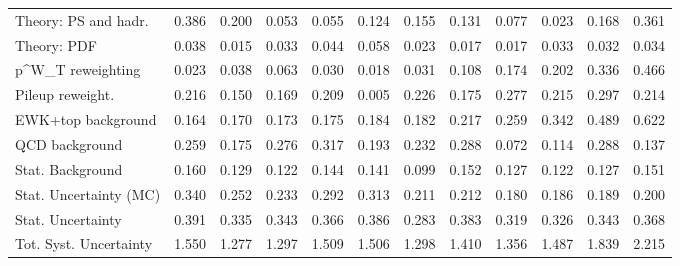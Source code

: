\begin{tabular}{l|p{0.6cm}p{0.6cm}p{0.6cm}p{0.6cm}p{0.6cm}p{0.6cm}p{0.6cm}p{0.6cm}p{0.6cm}p{0.6cm}p{0.6cm}}
Theory: PS and hadr.                     & 0.386 & 0.200 & 0.053 & 0.055 & 0.124 & 0.155 & 0.131 & 0.077 & 0.023 & 0.168 & 0.361 \\
Theory: PDF                              & 0.038 & 0.015 & 0.033 & 0.044 & 0.058 & 0.023 & 0.017 & 0.017 & 0.033 & 0.032 & 0.034 \\
p^{W}_{T} reweighting                    & 0.023 & 0.038 & 0.063 & 0.030 & 0.018 & 0.031 & 0.108 & 0.174 & 0.202 & 0.336 & 0.466 \\
Pileup reweight.                         & 0.216 & 0.150 & 0.169 & 0.209 & 0.005 & 0.226 & 0.175 & 0.277 & 0.215 & 0.297 & 0.214 \\
EWK+top background                       & 0.164 & 0.170 & 0.173 & 0.175 & 0.184 & 0.182 & 0.217 & 0.259 & 0.342 & 0.489 & 0.622 \\
QCD background                           & 0.259 & 0.175 & 0.276 & 0.317 & 0.193 & 0.232 & 0.288 & 0.072 & 0.114 & 0.288 & 0.137 \\
Stat. Background                         & 0.160 & 0.129 & 0.122 & 0.144 & 0.141 & 0.099 & 0.152 & 0.127 & 0.122 & 0.127 & 0.151 \\
Stat. Uncertainty (MC)                   & 0.340 & 0.252 & 0.233 & 0.292 & 0.313 & 0.211 & 0.212 & 0.180 & 0.186 & 0.189 & 0.200 \\
\hline
Stat. Uncertainty                        & 0.391 & 0.335 & 0.343 & 0.366 & 0.386 & 0.283 & 0.383 & 0.319 & 0.326 & 0.343 & 0.368 \\
\hline
Tot. Syst. Uncertainty                   & 1.550 & 1.277 & 1.297 & 1.509 & 1.506 & 1.298 & 1.410 & 1.356 & 1.487 & 1.839 & 2.215 \\
\hline
\end{tabular}
